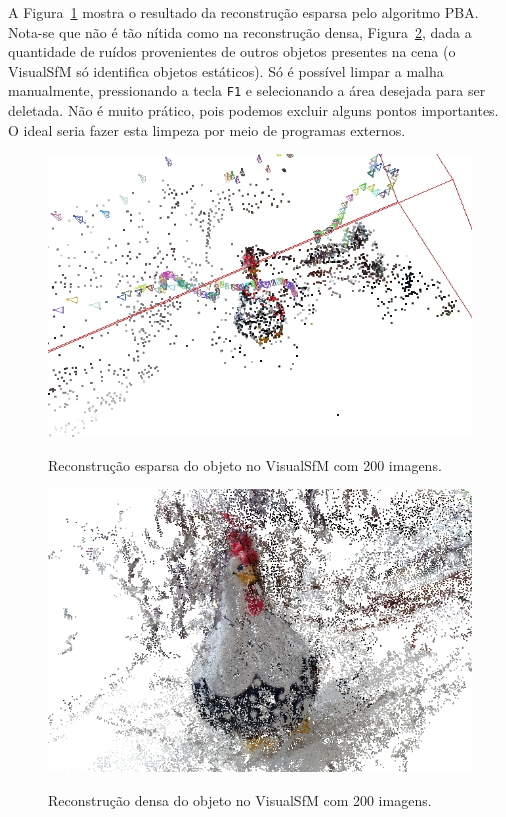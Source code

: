 A Figura~\ref{fig:reconstrucaoEsparsaVisualSFM} mostra o resultado da
reconstrução esparsa pelo algoritmo PBA. Nota-se que não é tão nítida como na reconstrução
densa, Figura~\ref{fig:reconstrucaoDensaVisualSFM}, dada a quantidade de ruídos
provenientes de outros objetos presentes na cena (o VisualSfM só identifica
objetos estáticos). Só é possível limpar a malha manualmente, pressionando a
tecla \texttt{F1} e selecionando a área desejada para ser deletada. Não é muito prático,
pois podemos excluir alguns pontos importantes. O ideal seria fazer esta limpeza
por meio de programas externos.

\begin{figure}[!h]
	\centering
	\caption{%
	Reconstrução esparsa do objeto no VisualSfM com 200 imagens.
	}
		\includegraphics[width=0.5\linewidth]{figs/galinhasparsa.jpg}
	\label{fig:reconstrucaoEsparsaVisualSFM}
\end{figure}

\begin{figure}[!h]
	\centering
\caption{%
	Reconstrução densa do objeto no VisualSfM com 200 imagens.
	}	
	\includegraphics[width=\linewidth]{figs/galinhadense.jpg}
	\label{fig:reconstrucaoDensaVisualSFM}
\end{figure}

